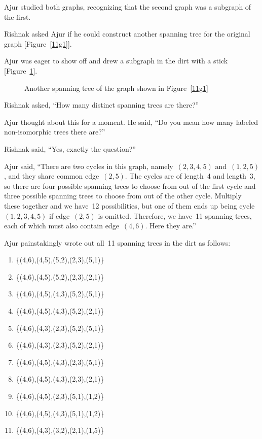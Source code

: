Ajur studied both graphs, recognizing that the second graph was a subgraph of the first.

Rishnak asked Ajur if he could construct another spanning tree for the original graph [Figure~\ref{11g1}].

Ajur was eager to show off and drew a subgraph in the dirt with a stick [Figure~\ref{11g3}].

\begin{figure}
\begin{center}
\caption{Another spanning tree of the graph shown in Figure~\ref{11g1}}\label{11g3}
\end{center}
\end{figure}

Rishnak asked, ``How many distinct spanning trees are there?''

Ajur thought about this for a moment. He said, ``Do you mean how many labeled non-isomorphic trees there are?''

Rishnak said, ``Yes, exactly the question?''

Ajur said, ``There are two cycles in this graph, namely~$(2,3,4,5)$ and~$(1,2,5)$, and they share common edge~$(2,5)$. The cycles are of length~4 and length~3, so there are four possible spanning trees to choose from out of the first cycle and three possible spanning trees to choose from out of the other cycle. Multiply these together and we have~12 possibilities, but one of them ends up being cycle~$(1,2,3,4,5)$ if edge~$(2,5)$ is omitted. Therefore, we have~11 spanning trees, each of which must also contain edge~$(4,6)$. Here they are.''

Ajur painstakingly wrote out all~11 spanning trees in the dirt as follows:
\begin{enumerate}
    \item \{(4,6),(4,5),(5,2),(2,3),(5,1)\}
    \item \{(4,6),(4,5),(5,2),(2,3),(2,1)\}
    \item \{(4,6),(4,5),(4,3),(5,2),(5,1)\}
    \item \{(4,6),(4,5),(4,3),(5,2),(2,1)\}
    \item \{(4,6),(4,3),(2,3),(5,2),(5,1)\}
    \item \{(4,6),(4,3),(2,3),(5,2),(2,1)\}
    \item \{(4,6),(4,5),(4,3),(2,3),(5,1)\}
    \item \{(4,6),(4,5),(4,3),(2,3),(2,1)\}
    \item \{(4,6),(4,5),(2,3),(5,1),(1,2)\}
    \item \{(4,6),(4,5),(4,3),(5,1),(1,2)\}
    \item \{(4,6),(4,3),(3,2),(2,1),(1,5)\}
\end{enumerate}

